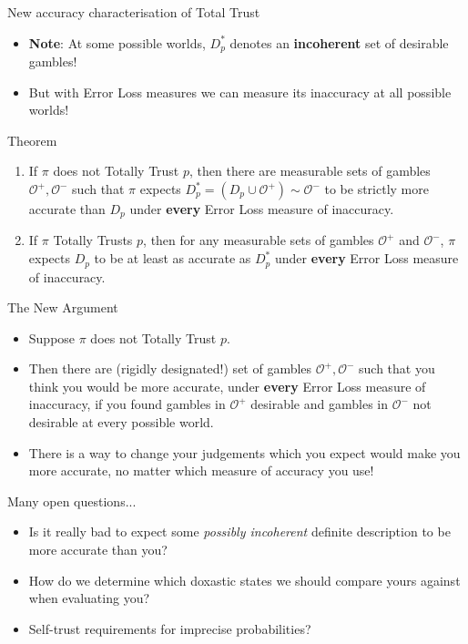 \documentclass[aspectratio=169, dvipsnames]{beamer}
\newcommand{\Oset}{\mathcal{O}}
\begin{document}
\begin{frame}{New accuracy characterisation of Total Trust}
  \begin{itemize}
  \item \textbf{Note}: At some possible worlds, $D_p^*$ denotes an \alert{\textbf{incoherent}} set of desirable gambles!
  \item But with Error Loss measures we can measure its inaccuracy at all possible worlds!
  \end{itemize}
  \begin{block}{Theorem}
    \begin{enumerate}
      \item If $\pi$ does not Totally Trust $p$, then there are measurable sets of gambles $\Oset^+, \Oset^-$ such that
        $\pi$ expects $D_p^* = (D_p \cup \Oset^+) \sim \Oset^-$ to be strictly more accurate than $D_p$ under \alert{\textbf{every}}
        Error Loss measure of inaccuracy.
      \item If $\pi$ Totally Trusts $p$, then for any measurable sets of gambles $\Oset^+$ and $\Oset^-$, $\pi$ expects $D_p$
        to be at least as accurate as $D_p^*$ under \alert{\textbf{every}} Error Loss measure of inaccuracy.
    \end{enumerate}
  \end{block}
\end{frame}

\begin{frame}{The New Argument}
  \begin{itemize}
  \item Suppose $\pi$ does not Totally Trust $p$.
  \item Then there are (rigidly designated!) set of gambles $\Oset^+, \Oset^-$ such that you think you would be more accurate,
    under \textbf{\alert{every}} Error Loss measure of inaccuracy, if you found gambles in $\Oset^+$ desirable and
    gambles in $\Oset^-$ not desirable at every possible world.
  \item There is a way to change your judgements which you expect would make you more accurate, no matter which measure of
    accuracy you use!
  \end{itemize}
\end{frame}

\begin{frame}{Many open questions...}
  \begin{itemize}
  \item Is it really bad to expect some \textit{possibly incoherent} definite description to be more accurate than you? 
  \item How do we determine which doxastic states we should compare yours against when evaluating you?
  \item Self-trust requirements for imprecise probabilities?
  \end{itemize}
  
\end{frame}
\end{document}
